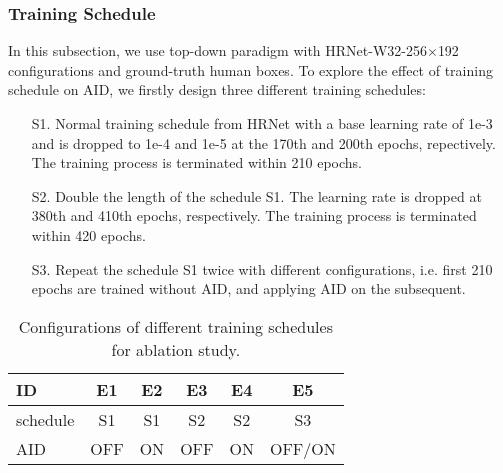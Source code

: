 \documentclass[final]{cvpr}
\begin{document}
\subsubsection{Training Schedule}
In this subsection, we use top-down paradigm with HRNet-W32-256$\times$192 configurations and ground-truth human boxes. To explore the effect of training schedule on AID, we firstly design three different training schedules:
\begin{itemize}
  \item [S1.]
  Normal training schedule from HRNet \cite{HRNet} with a base learning rate of 1e-3 and is dropped to 1e-4 and 1e-5 at the 170th and 200th epochs, repectively. The training process is terminated within 210 epochs.
  \item [S2.]
  Double the length of the schedule S1. The learning rate is dropped at 380th and 410th epochs, respectively. The training process is terminated within 420 epochs.
  \item [S3.]
  Repeat the schedule S1 twice with different configurations, i.e. first 210 epochs are trained without AID, and applying AID on the subsequent.
\end{itemize}


\begin{table}[h]
\footnotesize
\begin{center}
\begin{tabular}{l|c|c|c|c|c}

\hline
ID                              & E1    &E2   &E3 &E4 &E5        \\
\hline
schedule                        & S1    &S1   &S2 &S2 &S3\\
\hline
AID                             & OFF   &ON   &OFF&ON &OFF/ON  \\
\hline
\end{tabular}
\end{center}
\caption{Configurations of different training schedules for ablation study. }
\label{tab:config}
\end{table}
\end{document}
